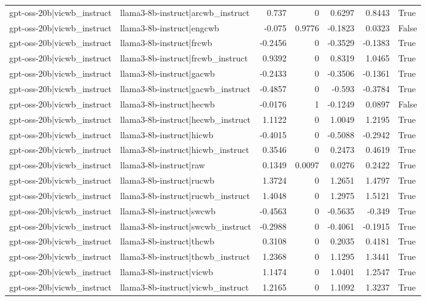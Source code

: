 \begin{table}
\begin{tabular}{l l r r r r l}
gpt-oss-20b|vicwb_instruct & llama3-8b-instruct|arcwb_instruct & 0.737 & 0 & 0.6297 & 0.8443 & True \\
gpt-oss-20b|vicwb_instruct & llama3-8b-instruct|engcwb & -0.075 & 0.9776 & -0.1823 & 0.0323 & False \\
gpt-oss-20b|vicwb_instruct & llama3-8b-instruct|frcwb & -0.2456 & 0 & -0.3529 & -0.1383 & True \\
gpt-oss-20b|vicwb_instruct & llama3-8b-instruct|frcwb_instruct & 0.9392 & 0 & 0.8319 & 1.0465 & True \\
gpt-oss-20b|vicwb_instruct & llama3-8b-instruct|gacwb & -0.2433 & 0 & -0.3506 & -0.1361 & True \\
gpt-oss-20b|vicwb_instruct & llama3-8b-instruct|gacwb_instruct & -0.4857 & 0 & -0.593 & -0.3784 & True \\
gpt-oss-20b|vicwb_instruct & llama3-8b-instruct|hecwb & -0.0176 & 1 & -0.1249 & 0.0897 & False \\
gpt-oss-20b|vicwb_instruct & llama3-8b-instruct|hecwb_instruct & 1.1122 & 0 & 1.0049 & 1.2195 & True \\
gpt-oss-20b|vicwb_instruct & llama3-8b-instruct|hicwb & -0.4015 & 0 & -0.5088 & -0.2942 & True \\
gpt-oss-20b|vicwb_instruct & llama3-8b-instruct|hicwb_instruct & 0.3546 & 0 & 0.2473 & 0.4619 & True \\
gpt-oss-20b|vicwb_instruct & llama3-8b-instruct|raw & 0.1349 & 0.0097 & 0.0276 & 0.2422 & True \\
gpt-oss-20b|vicwb_instruct & llama3-8b-instruct|rucwb & 1.3724 & 0 & 1.2651 & 1.4797 & True \\
gpt-oss-20b|vicwb_instruct & llama3-8b-instruct|rucwb_instruct & 1.4048 & 0 & 1.2975 & 1.5121 & True \\
gpt-oss-20b|vicwb_instruct & llama3-8b-instruct|swcwb & -0.4563 & 0 & -0.5635 & -0.349 & True \\
gpt-oss-20b|vicwb_instruct & llama3-8b-instruct|swcwb_instruct & -0.2988 & 0 & -0.4061 & -0.1915 & True \\
gpt-oss-20b|vicwb_instruct & llama3-8b-instruct|thcwb & 0.3108 & 0 & 0.2035 & 0.4181 & True \\
gpt-oss-20b|vicwb_instruct & llama3-8b-instruct|thcwb_instruct & 1.2368 & 0 & 1.1295 & 1.3441 & True \\
gpt-oss-20b|vicwb_instruct & llama3-8b-instruct|vicwb & 1.1474 & 0 & 1.0401 & 1.2547 & True \\
gpt-oss-20b|vicwb_instruct & llama3-8b-instruct|vicwb_instruct & 1.2165 & 0 & 1.1092 & 1.3237 & True \\

\end{tabular}
\end{table}
